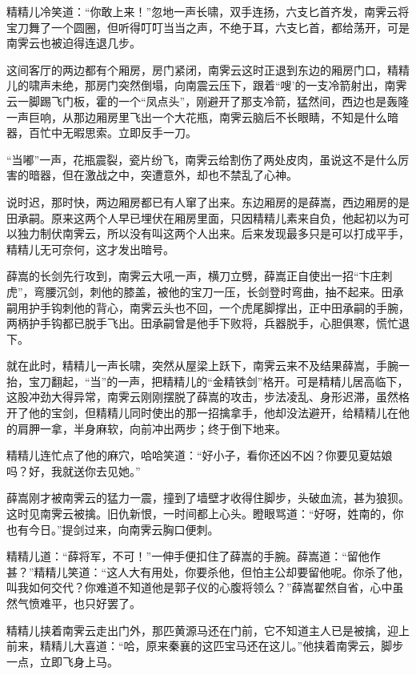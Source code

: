 \documentclass[12pt,oneside]{book}
\begin{document}
精精儿冷笑道：``你敢上来！''忽地一声长啸，双手连扬，六支匕首齐发，南霁云将宝刀舞了一个圆圈，但听得叮叮当当之声，不绝于耳，六支匕首，都给荡开，可是南霁云也被迫得连退几步。

这间客厅的两边都有个厢房，房门紧闭，南霁云这时正退到东边的厢房门口，精精儿的啸声未绝，那房门突然倒塌，向南震云压下，跟着``嗖'的一支冷箭射出，南霁云一脚踢飞门板，霍的一个``凤点头''，刚避开了那支冷箭，猛然间，西边也是轰隆一声巨响，从那边厢房里飞出一个大花瓶，南霁云脑后不长眼睛，不知是什么暗器，百忙中无暇思索。立即反手一刀。

``当嘟''一声，花瓶震裂，瓷片纷飞，南霁云给割伤了两处皮肉，虽说这不是什么厉害的暗器，但在激战之中，突遭意外，却也不禁乱了心神。

说时迟，那时快，两边厢房都已有人窜了出来。东边厢房的是薛嵩，西边厢房的是田承嗣。原来这两个人早已埋伏在厢房里面，只因精精儿素来自负，他起初以为可以独力制伏南霁云，所以没有叫这两个人出来。后来发现最多只是可以打成平手，精精儿无可奈何，这才发出暗号。

薛嵩的长剑先行攻到，南霁云大吼一声，横刀立劈，薛嵩正自使出一招``卞庄刺虎''，弯腰沉剑，刺他的膝盖，被他的宝刀一压，长剑登时弯曲，抽不起来。田承嗣用护手钩刺他的背心，南霁云头也不回，一个虎尾脚撑出，正中田承嗣的手腕，两柄护手钩都已脱手飞出。田承嗣曾是他手下败将，兵器脱手，心胆俱寒，慌忙退下。

就在此时，精精儿一声长啸，突然从屋梁上跃下，南霁云来不及结果薛嵩，手腕一抬，宝刀翻起，``当''的一声，把精精儿的``金精铁剑''格开。可是精精儿居高临下，这股冲劲大得异常，南霁云刚刚摆脱了薛嵩的攻击，步法凌乱、身形迟滞，虽然格开了他的宝剑，但精精儿同时使出的那一招擒拿手，他却没法避开，给精精儿在他的肩胛一拿，半身麻软，向前冲出两步；终于倒下地来。

精精儿连忙点了他的麻穴，哈哈笑道：``好小子，看你还凶不凶？你要见夏姑娘吗？好，我就送你去见她。''

薛嵩刚才被南霁云的猛力一震，撞到了墙壁才收得住脚步，头破血流，甚为狼狈。这时见南霁云被擒。旧仇新恨，一时间都上心头。瞪眼骂道：``好呀，姓南的，你也有今日。''提剑过来，向南霁云胸口便刺。

精精儿道：``薛将军，不可！''一伸手便扣住了薛嵩的手腕。薛嵩道：``留他作甚？''精精儿笑道：``这人大有用处，你要杀他，但怕主公却要留他呢。你杀了他，叫我如何交代？你难道不知道他是郭子仪的心腹将领么？''薛嵩翟然自省，心中虽然气愤难平，也只好罢了。

精精儿挟着南霁云走出门外，那匹黄源马还在门前，它不知道主人已是被擒，迎上前来，精精儿大喜道：``哈，原来秦襄的这匹宝马还在这儿。''他挟着南霁云，脚步一点，立即飞身上马。
\end{document}

